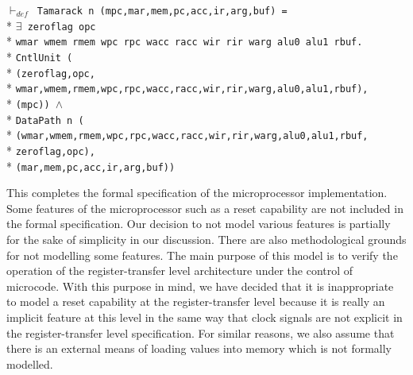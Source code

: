\begin{normalsize}
\hspace*{\fill}
\begin{minipage}{17cm}
$\vdash_{def}$\verb" Tamarack n (mpc,mar,mem,pc,acc,ir,arg,buf) ="\\*
$\exists$\verb" zeroflag opc"\\*
\verb"wmar wmem rmem wpc rpc wacc racc wir rir warg alu0 alu1 rbuf."\\*
\verb"CntlUnit ("\\*
\verb"(zeroflag,opc,"\\*
\verb"wmar,wmem,rmem,wpc,rpc,wacc,racc,wir,rir,warg,alu0,alu1,rbuf),"\\*
\verb"(mpc)) "$\wedge$\\*
\verb"DataPath n ("\\*
\verb"(wmar,wmem,rmem,wpc,rpc,wacc,racc,wir,rir,warg,alu0,alu1,rbuf,"\\*
\verb"zeroflag,opc),"\\*
\verb"(mar,mem,pc,acc,ir,arg,buf))"
\end{minipage}
\hspace*{\fill}

This completes the formal specification of the microprocessor
implementation.
Some features of the microprocessor such as a reset capability
are not included in the formal specification.
Our decision to not model various features is partially for the
sake of simplicity in our discussion.
There are also methodological grounds for not modelling some
features.  The main purpose of this model
is to verify the operation of the register-transfer level
architecture under the control of microcode.
With this purpose in mind,
we have decided that it is inappropriate to model
a reset capability at the register-transfer level
because it is really an implicit feature at this level
in the same way that clock signals are not explicit
in the register-transfer level specification.
For similar reasons, we also assume that there is an external
means of loading values into memory which is not formally modelled.


\end{normalsize}
